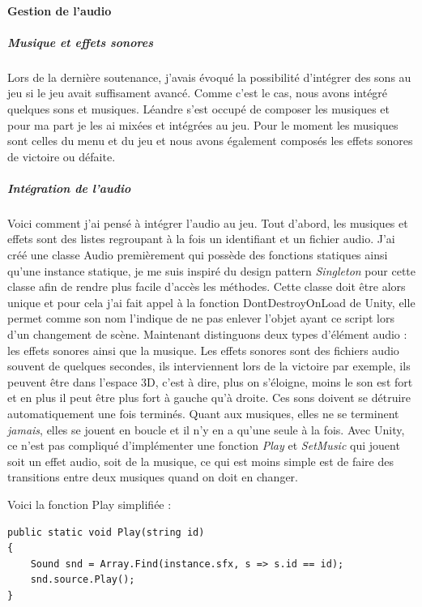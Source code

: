 \documentclass{article}
\begin{document}
\newpage
\paragraph{Gestion de l'audio}

\subparagraph{Musique et effets sonores}

Lors de la dernière soutenance, j'avais évoqué la possibilité d'intégrer des sons au jeu si le jeu avait suffisament avancé. Comme c'est le cas, nous avons intégré quelques sons et musiques. Léandre s'est occupé de composer les musiques et pour ma part je les ai mixées et intégrées au jeu. Pour le moment les musiques sont celles du menu et du jeu et nous avons également composés les effets sonores de victoire ou défaite.

\subparagraph{Intégration de l'audio}

Voici comment j'ai pensé à intégrer l'audio au jeu.
Tout d'abord, les musiques et effets sont des listes regroupant à la fois un identifiant et un fichier audio.
J'ai créé une classe Audio premièrement qui possède des fonctions statiques ainsi qu'une instance statique, je me suis inspiré du design pattern \emph{Singleton} pour cette classe afin de rendre plus facile d'accès les méthodes. Cette classe doit être alors unique et pour cela j'ai fait appel à la fonction DontDestroyOnLoad de Unity, elle permet comme son nom l'indique de ne pas enlever l'objet ayant ce script lors d'un changement de scène. Maintenant distinguons deux types d'élément audio : les effets sonores ainsi que la musique. Les effets sonores sont des fichiers audio souvent de quelques secondes, ils interviennent lors de la victoire par exemple, ils peuvent être dans l'espace 3D, c'est à dire, plus on s'éloigne, moins le son est fort et en plus il peut être plus fort à gauche qu'à droite. Ces sons doivent se détruire automatiquement une fois terminés. Quant aux musiques, elles ne se terminent \emph{jamais}, elles se jouent en boucle et il n'y en a qu'une seule à la fois. Avec Unity, ce n'est pas compliqué d'implémenter une fonction \emph{Play} et \emph{SetMusic} qui jouent soit un effet audio, soit de la musique, ce qui est moins simple est de faire des transitions entre deux musiques quand on doit en changer.

Voici la fonction Play simplifiée :
\begin{lstlisting}
public static void Play(string id)
{
    Sound snd = Array.Find(instance.sfx, s => s.id == id);
    snd.source.Play();
}
\end{lstlisting}
\end{document}
